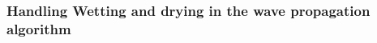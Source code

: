 \documentclass[10pt,a4paper]{article}
\newcommand{\ignore}[1]{}
\begin{document}
	\subsubsection{Handling Wetting and drying in the wave propagation algorithm}
	\ignore{
	The combination of equations in system \eqref{p2}, forms a system of one-dimensional SWEs given by equation \eqref{p3}
	
	\begin{eqnarray}
		\begin{bmatrix} h \\ hu \end{bmatrix}_t + \begin{bmatrix} uh \\ hu^{2} + \frac{1}{2} gh^{2} \end{bmatrix}_x  = 0 
		\label{p3}
	\end{eqnarray}
	Equation \eqref{p3} can be written as a quasi-linear system as shown in equation \eqref{p4}:
	
}
\end{document}
